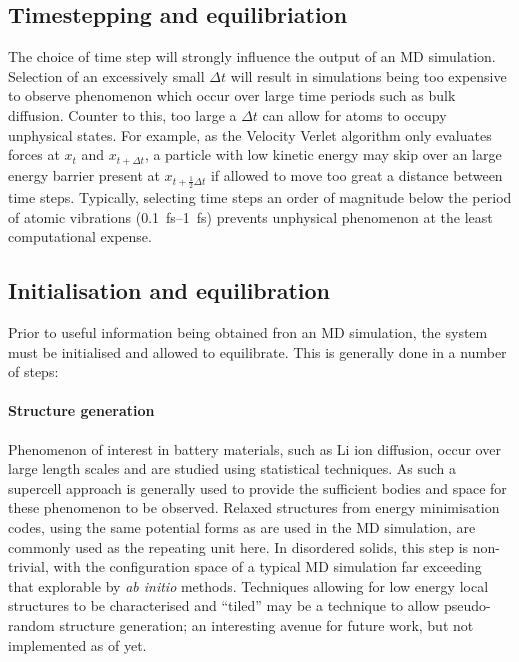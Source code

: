 \subsection{Timestepping and equilibriation}
The choice of time step will strongly influence the output of an MD simulation. 
Selection of an excessively small $\Delta t$ will result in simulations being too expensive to observe phenomenon which occur over large time periods such as bulk diffusion.
Counter to this, too large a $\Delta t$ can allow for atoms to occupy unphysical states.
For example, as the Velocity Verlet algorithm only evaluates forces at $x_{t}$ and $x_{t +\Delta t}$,  a particle with low kinetic energy may skip over an large energy barrier present at $x_{t +\frac{1}{2}\Delta t}$ if allowed to move too great a distance between time steps.
Typically, selecting time steps an order of magnitude below the period of atomic vibrations (\SIrange{0.1}{1}{\femto\second}) prevents unphysical phenomenon at the least computational expense.

\subsection{Initialisation and equilibration}
Prior to useful information being obtained fron an MD simulation, the system must be initialised and allowed to equilibrate.
This is generally done in a number of steps:
\paragraph{Structure generation}
Phenomenon of interest in battery materials, such as Li ion diffusion, occur over large length scales and are studied using statistical techniques.
As such a supercell approach is generally used to provide the sufficient bodies and space for these phenomenon to be observed.
Relaxed structures from energy minimisation codes, using the same potential forms as are used in the MD simulation, are commonly used as the repeating unit here.
In disordered solids, this step is non-trivial, with the configuration space of a typical MD simulation far exceeding that explorable by \textit{ab initio} methods.
Techniques allowing for low energy local structures to be characterised and ``tiled'' may be a technique to allow pseudo-random structure generation; an interesting avenue for future work, but not implemented as of yet.

